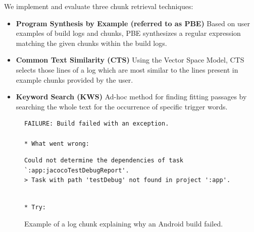 
We implement and evaluate three chunk retrieval techniques:
\begin{itemize}
  \item \textbf{Program Synthesis by Example (referred to as PBE)}
  Based on user examples of build logs and chunks, PBE
  synthesizes
  a regular expression matching the given chunks within the build logs.
  \item \textbf{Common Text Similarity (CTS)}
  Using the Vector Space Model, CTS selects those lines of a log which are
  most similar to the lines present in example chunks provided by
  the user.
  \item \textbf{Keyword Search (KWS)}
  Ad-hoc method for finding fitting passages by searching the whole
  text for
  the occurrence of specific trigger words.
\end{itemize}

\begin{figure}[!t]
  \centering
  \begin{lstlisting}[breaklines=true,frame=tlr]
FAILURE: Build failed with an exception.

* What went wrong:
  \end{lstlisting}
  \vspace{-\baselineskip}
  \begin{lstlisting}[backgroundcolor=\color{Cerulean!60},breaklines=true,frame=rl]
Could not determine the dependencies of task `:app:jacocoTestDebugReport'.
> Task with path 'testDebug' not found in project ':app'.
  \end{lstlisting}
  \vspace{-\baselineskip}
  \begin{lstlisting}[breaklines=true,frame=blr]

* Try:
  \end{lstlisting}
  \caption{Example of a log chunk explaining why an Android
  build failed.}
  \label{lst:chunk-example-1}
\end{figure}

